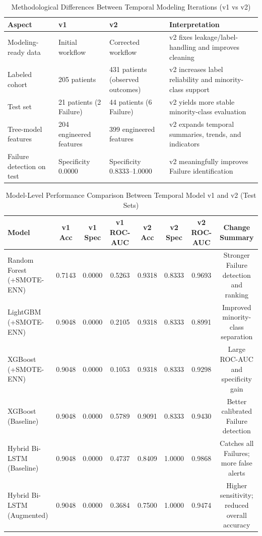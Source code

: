 \documentclass[12pt]{article}
\begin{document}
\begin{table}[H]
\caption{Methodological Differences Between Temporal Modeling Iterations (v1 vs v2)}
\label{tab:temporal_v1_v2_method_comparison}
\begin{tabular}{llll}
\toprule
Aspect & v1 & v2 & Interpretation \\
\midrule
Modeling-ready data & Initial workflow & Corrected workflow & v2 fixes leakage/label-handling and improves cleaning \\
Labeled cohort & 205 patients & 431 patients (observed outcomes) & v2 increases label reliability and minority-class support \\
Test set & 21 patients (2 Failure) & 44 patients (6 Failure) & v2 yields more stable minority-class evaluation \\
Tree-model features & 204 engineered features & 399 engineered features & v2 expands temporal summaries, trends, and indicators \\
Failure detection on test & Specificity 0.0000 & Specificity 0.8333--1.0000 & v2 meaningfully improves Failure identification \\
\bottomrule
\end{tabular}%
\end{table}

\begin{table}[H]
\caption{Model-Level Performance Comparison Between Temporal Model v1 and v2 (Test Sets)}
\label{tab:temporal_v1_v2_model_comparison}
\begin{tabular}{lccccccc}
\toprule
Model & v1 Acc & v1 Spec & v1 ROC-AUC & v2 Acc & v2 Spec & v2 ROC-AUC & Change Summary \\
\midrule
Random Forest (+SMOTE-ENN) & 0.7143 & 0.0000 & 0.5263 & 0.9318 & 0.8333 & 0.9693 & Stronger Failure detection and ranking \\
LightGBM (+SMOTE-ENN) & 0.9048 & 0.0000 & 0.2105 & 0.9318 & 0.8333 & 0.8991 & Improved minority-class separation \\
XGBoost (+SMOTE-ENN) & 0.9048 & 0.0000 & 0.1053 & 0.9318 & 0.8333 & 0.9298 & Large ROC-AUC and specificity gain \\
XGBoost (Baseline) & 0.9048 & 0.0000 & 0.5789 & 0.9091 & 0.8333 & 0.9430 & Better calibrated Failure detection \\
Hybrid Bi-LSTM (Baseline) & 0.9048 & 0.0000 & 0.4737 & 0.8409 & 1.0000 & 0.9868 & Catches all Failures; more false alerts \\
Hybrid Bi-LSTM (Augmented) & 0.9048 & 0.0000 & 0.3684 & 0.7500 & 1.0000 & 0.9474 & Higher sensitivity; reduced overall accuracy \\
\bottomrule
\end{tabular}%
\end{table}
\end{document}
